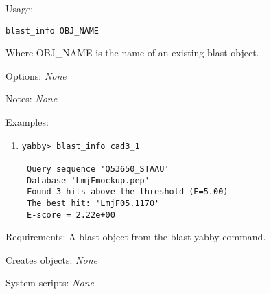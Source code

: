 \begin{description}


\item{Usage:}

{\tt blast\_info OBJ\_NAME}

Where OBJ\_NAME is the name of an existing blast object.



\item{Options:} {\em None}


\item{Notes:} {\em None}


\item{Examples:}
\begin{enumerate}

\item
\begin{verbatim}
yabby> blast_info cad3_1

 Query sequence 'Q53650_STAAU'
 Database 'LmjFmockup.pep'
 Found 3 hits above the threshold (E=5.00)
 The best hit: 'LmjF05.1170'
 E-score = 2.22e+00

\end{verbatim}

\end{enumerate}


\item{Requirements:} A blast object from the blast yabby command.


\item{Creates objects:} {\em None}


\item{System scripts:} {\em None}

\end{description}



\subsection[blastg]{  }


